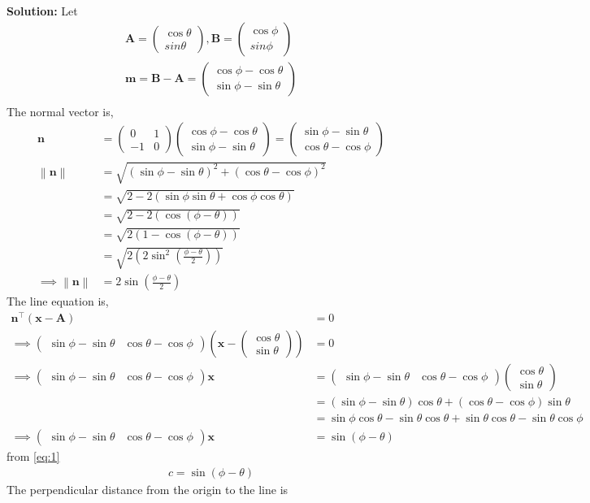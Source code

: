 \documentclass[10pt]{article}
\providecommand{\brak}[1]{\ensuremath{\left(#1\right)}}
\newcommand{\solution}{\noindent \textbf{Solution: }}
\newcommand{\myvec}[1]{\ensuremath{\begin{pmatrix}#1\end{pmatrix}}}
\providecommand{\norm}[1]{\left\lVert#1\right\rVert}
\let\vec\mathbf{}
\begin{document}
\begin{enumerate}
\solution
Let
\begin{align}
\vec{A}=\myvec{\cos\theta\\sin\theta},\vec{B}=\myvec{\cos\phi\\sin\phi}\\
\vec{m}=\vec{B}-\vec{A}=\myvec{\cos\phi-\cos\theta\\\sin\phi-\sin\theta}\\
\end{align}
The normal vector is,
\begin{align}
\vec{n}&=\myvec{0&1\\-1&0}\myvec{\cos\phi-\cos\theta\\\sin\phi-\sin\theta}=\myvec{\sin\phi-\sin\theta\\\cos\theta-\cos\phi}\\
\norm{\vec{n}}&=\sqrt{\brak{\sin\phi-\sin\theta}^2+\brak{\cos\theta-\cos\phi}^2}\\
&=\sqrt{2-2\brak{\sin\phi\sin\theta+\cos\phi\cos\theta}}\\
&=\sqrt{2-2\brak{\cos\brak{\phi-\theta}}}\\
&=\sqrt{2\brak{1-\cos\brak{\phi-\theta}}}\\
&=\sqrt{2\brak{2\sin^2\brak{\frac{\phi-\theta}{2}}}}\\
\implies\norm{\vec{n}}&=2\sin\brak{\frac{\phi-\theta}{2}}
\end{align}
The line equation is,
\begin{align}
\vec{n}^\top\brak{\vec{x}-\vec{A}}&=0\\
\implies\myvec{\sin\phi-\sin\theta&\cos\theta-\cos\phi}\brak{\vec{x}-\myvec{\cos\theta\\\sin\theta}}&=0\\
\implies\myvec{\sin\phi-\sin\theta&\cos\theta-\cos\phi}\vec{x}&=\myvec{\sin\phi-\sin\theta&\cos\theta-\cos\phi}\myvec{\cos\theta\\\sin\theta}\\
&=\brak{\sin\phi-\sin\theta}\cos\theta+\brak{\cos\theta-\cos\phi}\sin\theta\\
&=\sin\phi\cos\theta-\sin\theta\cos\theta+\sin\theta\cos\theta-\sin\theta\cos\phi\\
\implies\myvec{\sin\phi-\sin\theta&\cos\theta-\cos\phi}\vec{x}&=\sin\brak{\phi-\theta}
\label{eq:1}
\end{align}
from \eqref{eq:1}
\begin{align}
c=\sin\brak{\phi-\theta}
\end{align}
The perpendicular distance from the origin to the line is
\begin{align}

\end{align}
\end{enumerate}
\end{document}
